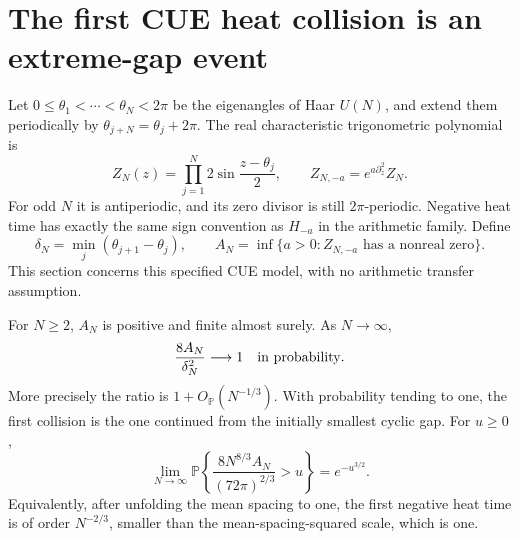 \section{The first CUE heat collision is an extreme-gap event}
\label{sec:analytic-cue-first-collision}

Let $0\le\theta_1<\cdots<\theta_N<2\pi$ be the eigenangles
of Haar $U(N)$, and extend them periodically by
$\theta_{j+N}=\theta_j+2\pi$. The real characteristic
trigonometric polynomial is
\[
 Z_N(z)=\prod_{j=1}^N2\sin\frac{z-\theta_j}{2},\qquad
 Z_{N,-a}=e^{a\partial_z^2}Z_N .
\]
For odd $N$ it is antiperiodic, and its zero divisor is
still $2\pi$-periodic. Negative heat time has exactly the
same sign convention as $H_{-a}$ in the arithmetic family.
Define
\[
 \delta_N=\min_j(\theta_{j+1}-\theta_j),\qquad
 A_N=\inf\{a>0:Z_{N,-a}\text{ has a nonreal zero}\}.
\]
This section concerns this specified CUE model, with no
arithmetic transfer assumption.

\begin{theorem}
For $N\ge2$, $A_N$ is positive and finite almost surely.
As $N\to\infty$,
\[
                    \frac{8A_N}{\delta_N^2}
                                  \longrightarrow1
                                  \quad\hbox{in probability}.
\]
More precisely the ratio is $1+O_{\mathbb P}(N^{-1/3})$.
With probability tending to one, the first collision is
the one continued from the initially smallest cyclic gap.
For $u\ge0$,
\begin{equation}\label{eq:analytic-cue-first-time-law}
 \lim_{N\to\infty}
 \mathbb P\left\{
       \frac{8N^{8/3}A_N}{(72\pi)^{2/3}}>u\right\}
                              =e^{-u^{3/2}}.
\end{equation}
Equivalently, after unfolding the mean spacing to one,
the first negative heat time is of order $N^{-2/3}$,
smaller than the mean-spacing-squared scale, which is one.
\end{theorem}

